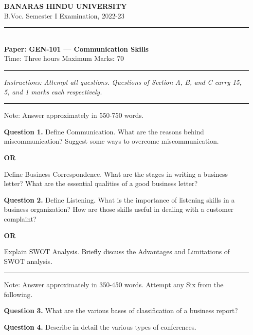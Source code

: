 \documentclass[11pt,a4paper]{article}
\begin{document}
\begin{center}
  {\large\bfseries BANARAS HINDU UNIVERSITY}\\[2pt]
  {
\normalsize B.Voc. Semester I Examination, 2022-23}\\[6pt]
  \rule{0.8\linewidth}{0.5pt}\\[6pt]
  {\large\bfseries Paper: GEN-101 --- Communication Skills}\\[4pt]
  {
\normalsize Time: Three hours \hfill Maximum Marks: 70}
\end{center}

\rule{\linewidth}{0.4pt}

\smallskip



\noindent   \textit{Instructions: Attempt all questions. Questions of Section A, B, and C carry 15, 5, and 1 marks each respectively.}

\bigskip

\bigskip


\rule{\linewidth}{0.4pt}\smallskip

Note: Answer approximately in 550-750 words.

\medskip


\noindent   \textbf{Question 1.} Define Communication. What are the reasons behind miscommunication? Suggest some ways to overcome miscommunication.
\centerline{   \textbf{OR}}
Define Business Correspondence. What are the stages in writing a business letter? What are the essential qualities of a good business letter?

\medskip


\noindent   \textbf{Question 2.} Define Listening. What is the importance of listening skills in a business organization? How are those skills useful in dealing with a customer complaint?
\centerline{   \textbf{OR}}
Explain SWOT Analysis. Briefly discuss the Advantages and Limitations of SWOT analysis.

\bigskip


\rule{\linewidth}{0.4pt}\smallskip

Note: Answer approximately in 350-450 words. Attempt any Six from the following.

\medskip


\noindent   \textbf{Question 3.} What are the various bases of classification of a business report?

\medskip


\noindent   \textbf{Question 4.} Describe in detail the various types of conferences.
\end{document}
